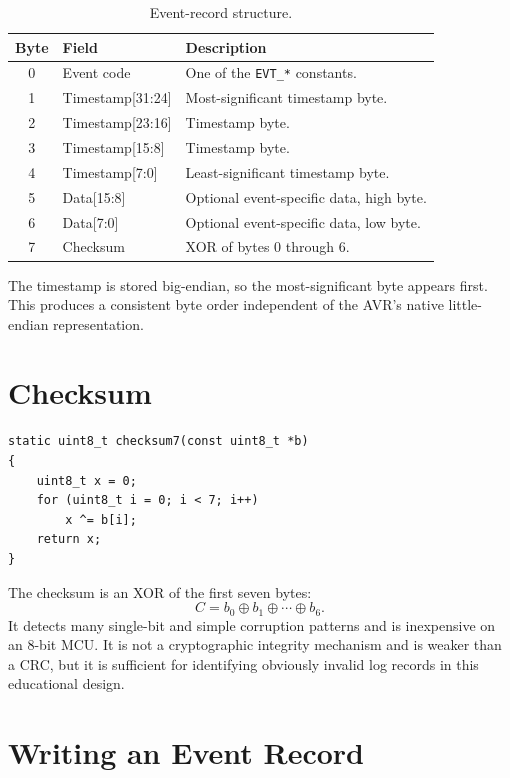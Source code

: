 \documentclass[11pt,a4paper]{article}
\begin{document}
\begin{table}[H]
\centering
\caption{Event-record structure.}
\begin{tabular}{clp{}}
\toprule
Byte & Field & Description \\
\midrule
0 & Event code & One of the \texttt{EVT\_*} constants. \\
1 & Timestamp[31:24] & Most-significant timestamp byte. \\
2 & Timestamp[23:16] & Timestamp byte. \\
3 & Timestamp[15:8] & Timestamp byte. \\
4 & Timestamp[7:0] & Least-significant timestamp byte. \\
5 & Data[15:8] & Optional event-specific data, high byte. \\
6 & Data[7:0] & Optional event-specific data, low byte. \\
7 & Checksum & XOR of bytes 0 through 6. \\
\bottomrule
\end{tabular}
\end{table}

The timestamp is stored big-endian, so the most-significant byte appears first. This produces a consistent byte order independent of the AVR's native little-endian representation.

\section{Checksum}

\begin{lstlisting}[style=cstyle]
static uint8_t checksum7(const uint8_t *b)
{
    uint8_t x = 0;
    for (uint8_t i = 0; i < 7; i++)
        x ^= b[i];
    return x;
}
\end{lstlisting}

The checksum is an XOR of the first seven bytes:
\[
C=b_0\oplus b_1\oplus\cdots\oplus b_6.
\]
It detects many single-bit and simple corruption patterns and is inexpensive on an 8-bit MCU. It is not a cryptographic integrity mechanism and is weaker than a CRC, but it is sufficient for identifying obviously invalid log records in this educational design.

\section{Writing an Event Record}
\end{document}
